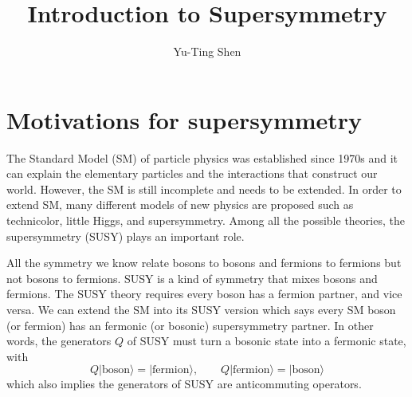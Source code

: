 \documentclass[12pt]{report}
\title{Introduction to Supersymmetry}
\author{Yu-Ting Shen}
\affil{Homer L. Dodge Department of Physics and Astronomy\\
The University of Oklahoma}
\date{} %
\begin{document}
\maketitle
\tableofcontents


\chapter{Motivations for supersymmetry}
The Standard Model (SM) of particle physics was established since 1970s and it can explain the elementary particles and the interactions that construct our world.
However, the SM is still incomplete and needs to be extended.
In order to extend SM, many different models of new physics are proposed such as technicolor, little Higgs, and supersymmetry.
Among all the possible theories, the supersymmetry (SUSY) \cite{wess_and_zumino} plays an important role.

All the symmetry we know relate bosons to bosons and fermions to fermions but not bosons to fermions.
SUSY is a kind of symmetry that mixes bosons and fermions.
The SUSY theory requires every boson has a fermion partner, and vice versa.
We can extend the SM into its SUSY version which says every SM boson (or fermion) has an fermonic (or bosonic) supersymmetry partner.
In other words, the generators $Q$ of SUSY must turn a bosonic state into a fermonic state, with
\begin{equation}
Q|\mathrm{boson}\rangle = |\mathrm{fermion}\rangle, \qquad 
Q|\mathrm{fermion}\rangle = |\mathrm{boson}\rangle
\end{equation}
which also implies the generators of SUSY are anticommuting operators.
\end{document}

